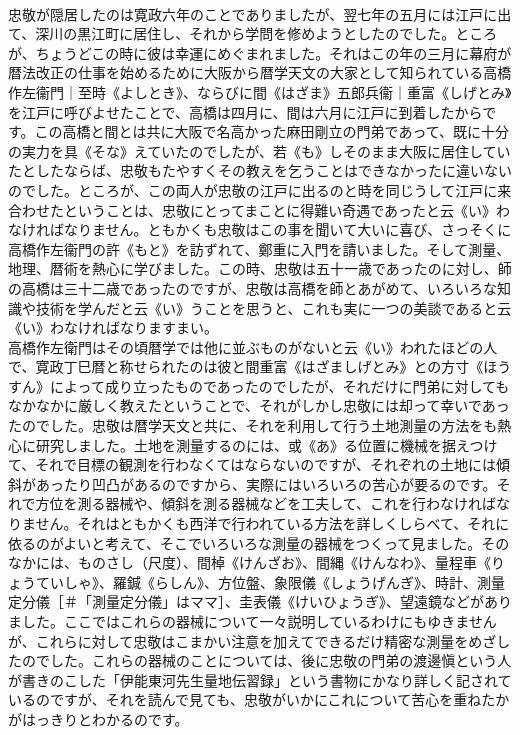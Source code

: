 \documentclass[8pt]{extreport}
\begin{document}
\begin{CJK}{UTF8}{min}
\\	忠敬が隠居したのは寛政六年のことでありましたが、翌七年の五月には江戸に出て、深川の黒江町に居住し、それから学問を修めようとしたのでした。ところが、ちょうどこの時に彼は幸運にめぐまれました。それはこの年の三月に幕府が暦法改正の仕事を始めるために大阪から暦学天文の大家として知られている高橋作左衞門｜至時《よしとき》、ならびに間《はざま》五郎兵衞｜重富《しげとみ》を江戸に呼びよせたことで、高橋は四月に、間は六月に江戸に到着したからです。この高橋と間とは共に大阪で名高かった麻田剛立の門弟であって、既に十分の実力を具《そな》えていたのでしたが、若《も》しそのまま大阪に居住していたとしたならば、忠敬もたやすくその教えを乞うことはできなかったに違いないのでした。ところが、この両人が忠敬の江戸に出るのと時を同じうして江戸に来合わせたということは、忠敬にとってまことに得難い奇遇であったと云《い》わなければなりません。ともかくも忠敬はこの事を聞いて大いに喜び、さっそくに高橋作左衞門の許《もと》を訪ずれて、鄭重に入門を請いました。そして測量、地理、暦術を熱心に学びました。この時、忠敬は五十一歳であったのに対し、師の高橋は三十二歳であったのですが、忠敬は高橋を師とあがめて、いろいろな知識や技術を学んだと云《い》うことを思うと、これも実に一つの美談であると云《い》わなければなりますまい。
\\	高橋作左衛門はその頃暦学では他に並ぶものがないと云《い》われたほどの人で、寛政丁巳暦と称せられたのは彼と間重富《はざましげとみ》との方寸《ほうすん》によって成り立ったものであったのでしたが、それだけに門弟に対してもなかなかに厳しく教えたということで、それがしかし忠敬には却って幸いであったのでした。忠敬は暦学天文と共に、それを利用して行う土地測量の方法をも熱心に研究しました。土地を測量するのには、或《あ》る位置に機械を据えつけて、それで目標の観測を行わなくてはならないのですが、それぞれの土地には傾斜があったり凹凸があるのですから、実際にはいろいろの苦心が要るのです。それで方位を測る器械や、傾斜を測る器械などを工夫して、これを行わなければなりません。それはともかくも西洋で行われている方法を詳しくしらべて、それに依るのがよいと考えて、そこでいろいろな測量の器械をつくって見ました。そのなかには、ものさし（尺度）、間棹《けんざお》、間縄《けんなわ》、量程車《りょうていしゃ》、羅鍼《らしん》、方位盤、象限儀《しょうげんぎ》、時計、測量定分儀［＃「測量定分儀」はママ］、圭表儀《けいひょうぎ》、望遠鏡などがありました。ここではこれらの器械について一々説明しているわけにもゆきませんが、これらに対して忠敬はこまかい注意を加えてできるだけ精密な測量をめざしたのでした。これらの器械のことについては、後に忠敬の門弟の渡邊愼という人が書きのこした「伊能東河先生量地伝習録」という書物にかなり詳しく記されているのですが、それを読んで見ても、忠敬がいかにこれについて苦心を重ねたかがはっきりとわかるのです。

\end{CJK}
\end{document}
